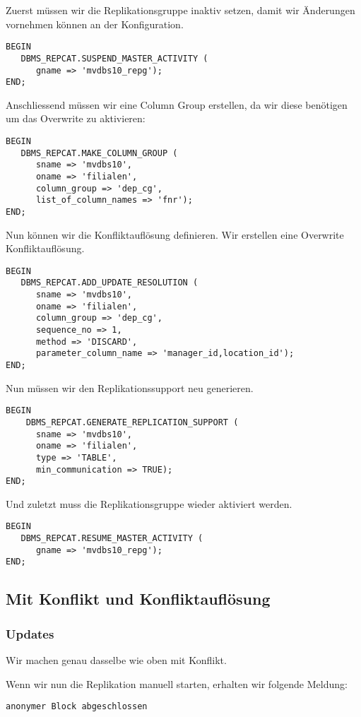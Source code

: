 \documentclass[11pt,a4paper,parskip=half]{scrartcl}
\begin{document}
Zuerst müssen wir die Replikationsgruppe inaktiv setzen, damit wir Änderungen vornehmen können an der Konfiguration.
\begin{lstlisting}
BEGIN
   DBMS_REPCAT.SUSPEND_MASTER_ACTIVITY (
      gname => 'mvdbs10_repg');
END;
\end{lstlisting}

Anschliessend müssen wir eine Column Group erstellen, da wir diese benötigen um das Overwrite zu aktivieren:
\begin{lstlisting}
BEGIN
   DBMS_REPCAT.MAKE_COLUMN_GROUP (
      sname => 'mvdbs10',
      oname => 'filialen',
      column_group => 'dep_cg',
      list_of_column_names => 'fnr');
END;
\end{lstlisting}

Nun können wir die Konfliktauflösung definieren. Wir erstellen eine Overwrite Konfliktauflösung.
\begin{lstlisting}
BEGIN
   DBMS_REPCAT.ADD_UPDATE_RESOLUTION (
      sname => 'mvdbs10',
      oname => 'filialen',
      column_group => 'dep_cg',
      sequence_no => 1,
      method => 'DISCARD',
      parameter_column_name => 'manager_id,location_id');
END;
\end{lstlisting}

Nun müssen wir den Replikationssupport neu generieren.
\begin{lstlisting}
BEGIN 
    DBMS_REPCAT.GENERATE_REPLICATION_SUPPORT (
      sname => 'mvdbs10',
      oname => 'filialen', 
      type => 'TABLE',
      min_communication => TRUE); 
END;
\end{lstlisting}

Und zuletzt muss die Replikationsgruppe wieder aktiviert werden.
\begin{lstlisting}
BEGIN
   DBMS_REPCAT.RESUME_MASTER_ACTIVITY (
      gname => 'mvdbs10_repg');
END;
\end{lstlisting}

\subsection{Mit Konflikt und Konfliktauflösung}
\subsubsection{Updates}
Wir machen genau dasselbe wie oben mit Konflikt.

Wenn wir nun die Replikation manuell starten, erhalten wir folgende Meldung:
\begin{lstlisting}
anonymer Block abgeschlossen
\end{lstlisting}
\end{document}
